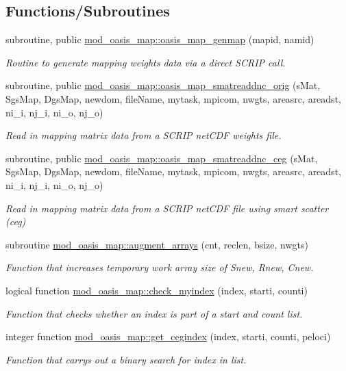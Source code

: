 \subsection*{Functions/\+Subroutines}
\begin{DoxyCompactItemize}
\item 
subroutine, public \hyperlink{namespacemod__oasis__map_a6f27846fb1dcb2db3095b9ace4fa3c5b}{mod\+\_\+oasis\+\_\+map\+::oasis\+\_\+map\+\_\+genmap} (mapid, namid)
\begin{DoxyCompactList}\small\item\em Routine to generate mapping weights data via a direct S\+C\+R\+IP call. \end{DoxyCompactList}\item 
subroutine, public \hyperlink{namespacemod__oasis__map_acbe7b9e25c19dbbd2fbebd3895a87d64}{mod\+\_\+oasis\+\_\+map\+::oasis\+\_\+map\+\_\+smatreaddnc\+\_\+orig} (s\+Mat, Sgs\+Map, Dgs\+Map, newdom, file\+Name, mytask, mpicom, nwgts, areasrc, areadst, ni\+\_\+i, nj\+\_\+i, ni\+\_\+o, nj\+\_\+o)
\begin{DoxyCompactList}\small\item\em Read in mapping matrix data from a S\+C\+R\+IP net\+C\+DF weights file. \end{DoxyCompactList}\item 
subroutine, public \hyperlink{namespacemod__oasis__map_a3345e2fc3d74cc1221d6c6d993233990}{mod\+\_\+oasis\+\_\+map\+::oasis\+\_\+map\+\_\+smatreaddnc\+\_\+ceg} (s\+Mat, Sgs\+Map, Dgs\+Map, newdom, file\+Name, mytask, mpicom, nwgts, areasrc, areadst, ni\+\_\+i, nj\+\_\+i, ni\+\_\+o, nj\+\_\+o)
\begin{DoxyCompactList}\small\item\em Read in mapping matrix data from a S\+C\+R\+IP net\+C\+DF file using smart scatter (ceg) \end{DoxyCompactList}\item 
subroutine \hyperlink{namespacemod__oasis__map_a84a573c180be2a5dc8a14fd18b2dc4b7}{mod\+\_\+oasis\+\_\+map\+::augment\+\_\+arrays} (cnt, reclen, bsize, nwgts)
\begin{DoxyCompactList}\small\item\em Function that increases temporary work array size of Snew, Rnew, Cnew. \end{DoxyCompactList}\item 
logical function \hyperlink{namespacemod__oasis__map_a2528f60bde618dd4840d3adb5a569996}{mod\+\_\+oasis\+\_\+map\+::check\+\_\+myindex} (index, starti, counti)
\begin{DoxyCompactList}\small\item\em Function that checks whether an index is part of a start and count list. \end{DoxyCompactList}\item 
integer function \hyperlink{namespacemod__oasis__map_a8889e0dcab8e1e894d3203c480110bed}{mod\+\_\+oasis\+\_\+map\+::get\+\_\+cegindex} (index, starti, counti, peloci)
\begin{DoxyCompactList}\small\item\em Function that carrys out a binary search for index in list. \end{DoxyCompactList}\end{DoxyCompactItemize}
